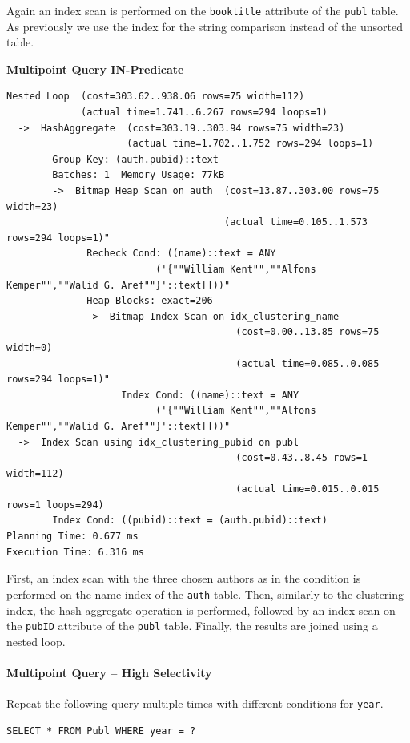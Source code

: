 \documentclass[11pt]{scrartcl}
\begin{document}
Again an index scan is performed on the \texttt{booktitle} attribute of the \texttt{publ} table.
As previously we use the index for the string comparison instead of the unsorted table.

\textbf{Multipoint Query IN-Predicate}
{\small
\parskip0pt\begin{verbatim}
Nested Loop  (cost=303.62..938.06 rows=75 width=112)
             (actual time=1.741..6.267 rows=294 loops=1)
  ->  HashAggregate  (cost=303.19..303.94 rows=75 width=23)
                     (actual time=1.702..1.752 rows=294 loops=1)
        Group Key: (auth.pubid)::text
        Batches: 1  Memory Usage: 77kB
        ->  Bitmap Heap Scan on auth  (cost=13.87..303.00 rows=75 width=23)
                                      (actual time=0.105..1.573 rows=294 loops=1)"
              Recheck Cond: ((name)::text = ANY
                          ('{""William Kent"",""Alfons Kemper"",""Walid G. Aref""}'::text[]))"
              Heap Blocks: exact=206
              ->  Bitmap Index Scan on idx_clustering_name
                                        (cost=0.00..13.85 rows=75 width=0)
                                        (actual time=0.085..0.085 rows=294 loops=1)"
                    Index Cond: ((name)::text = ANY
                          ('{""William Kent"",""Alfons Kemper"",""Walid G. Aref""}'::text[]))"
  ->  Index Scan using idx_clustering_pubid on publ
                                        (cost=0.43..8.45 rows=1 width=112)
                                        (actual time=0.015..0.015 rows=1 loops=294)
        Index Cond: ((pubid)::text = (auth.pubid)::text)
Planning Time: 0.677 ms
Execution Time: 6.316 ms
\end{verbatim}}

First, an index scan with the three chosen authors as in the condition is performed on the name index of the \texttt{auth}
table.
Then, similarly to the clustering index, the hash aggregate operation is performed, followed by an index scan on the
\texttt{pubID} attribute of the \texttt{publ} table.
Finally, the results are joined using a nested loop.

\paragraph{Multipoint Query -- High Selectivity}

Repeat the following query multiple times with different conditions for \texttt{year}.

\begin{lstlisting}[style=dbtsql]
SELECT * FROM Publ WHERE year = ?
\end{lstlisting}
\end{document}
